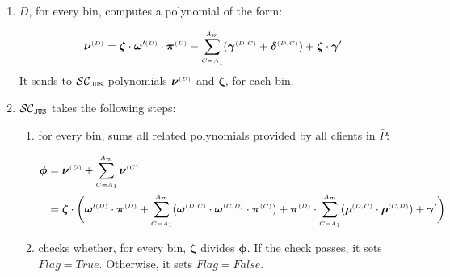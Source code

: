 \begin{enumerate}
\item\label{f-psi::D-gen-switching-poly}  $ {D}$,  for every bin, computes a polynomial of the form:  

$$\bm\nu^{\scriptscriptstyle  {  {(D)}}}=\bm\zeta \cdot  \bm\omega'^{\scriptscriptstyle  {  {(D)}}}\cdot \bm\pi^{\scriptscriptstyle  {  {(D)}} }-\sum\limits^{\scriptscriptstyle  {   A}_{\scriptscriptstyle  {   m}}}_{\scriptscriptstyle   {  {C }= }   {   A}_{\scriptscriptstyle  {  1}}}(\bm\gamma^{\scriptscriptstyle  {  {(D,C)}}} + \bm\delta^{\scriptscriptstyle  {  {(D,C)}}}) + \bm\zeta \cdot \bm\gamma'$$ 
It sends to $\mathcal{SC}_{\mathtt{JUS}}$  polynomials $\bm\nu^{\scriptscriptstyle  {  {(D)}}}$ and $\bm\zeta$, for each bin.

 \item\label{compute-res-poly}  $\mathcal{SC}_{\mathtt{JUS}}$ takes the following steps:
 \begin{enumerate}
 \item for every bin, sums all related polynomials  provided by all clients in $\bar{P}$:
 
 \begin{equation*}
\begin{split}
 \bm\phi&= \bm\nu^{\scriptscriptstyle  {  {(D)}} }+\sum\limits^{\scriptscriptstyle  {   A}_{\scriptscriptstyle  {   m}}}_{\scriptscriptstyle   {  {C }= }   {   A}_{\scriptscriptstyle  {  1}}}\bm\nu^{\scriptscriptstyle  {  {(C)}} }\\
 &= \bm\zeta\cdot \bigg(\bm\omega'^{\scriptscriptstyle  {  {(D)}}}\cdot \bm\pi^{\scriptscriptstyle  {  {(D)}} } +\sum\limits^{\scriptscriptstyle  {   A}_{  {   m}}}_{\scriptscriptstyle  {  {C }= }   {   A}_{\scriptscriptstyle  {  1}}}(\bm\omega^{\scriptscriptstyle  {  {(D,C)}}} \cdot \bm\omega^{\scriptscriptstyle  {  {(C,D)}}}\cdot \bm\pi^{\scriptscriptstyle  {  (C)}}) +\bm\pi^{\scriptscriptstyle  {  {(D)}}}\cdot\sum\limits^{\scriptscriptstyle  {   A}_{ \scriptscriptstyle {   m}}}_{\scriptscriptstyle  {C= }   {   A}_{\scriptscriptstyle  {  1}}}(\bm\rho^{\scriptscriptstyle  {  {(D,C)}}} \cdot \bm\rho^{\scriptscriptstyle  {  {(C,D)}}}) + \bm\gamma'\bigg)
  \end{split}
\end{equation*}
 
  \item\label{F-PSI:detect-misbehaving-party} checks whether, for every bin, $\bm\zeta$ divides $\bm\phi$. If the check passes, it sets $Flag=True$. Otherwise, it sets $Flag=False$. 
  
 
 
 \end{enumerate}
 

\end{enumerate}

